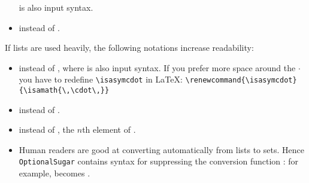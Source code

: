 \begin{isabellebody}
\begin{isamarkuptext}
\begin{itemize}
  is also input syntax.
\item {} instead of .
\end{itemize}%
\end{isamarkuptext}%
\isamarkuptrue%
%
\isamarkuptrue%
%
\begin{isamarkuptext}%
If lists are used heavily, the following notations increase readability:
\begin{itemize}
\item {} instead of ,
      where  is also input syntax.
If you prefer more space around the $\cdot$ you have to redefine
\verb!\isasymcdot! in \LaTeX:
\verb!\renewcommand{\isasymcdot}{\isamath{\,\cdot\,}}!

\item {} instead of .
\item {} instead of ,
      the $n$th element of .

\item Human readers are good at converting automatically from lists to
sets. Hence \texttt{OptionalSugar} contains syntax for suppressing the
conversion function : for example, 
becomes .


\end{itemize}
\end{isamarkuptext}
\end{isabellebody}
